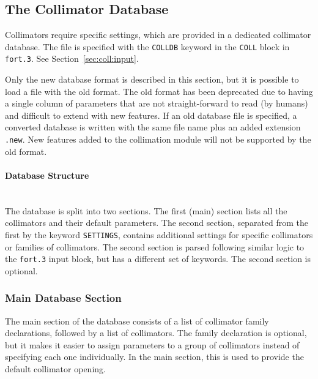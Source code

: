 
\subsection{The Collimator Database}\label{Sec:CollDB}

Collimators require specific settings, which are provided in a dedicated collimator database.
The file is specified with the \texttt{COLLDB} keyword in the \texttt{COLL} block in \texttt{fort.3}.
See Section~\ref{sec:coll:input}.

Only the new database format is described in this section, but it is possible to load a file with the old format.
The old format has been deprecated due to having a single column of parameters that are not straight-forward to read (by humans) and difficult to extend with new features.
If an old database file is specified, a converted database is written with the same file name plus an added extension \texttt{.new}.
New features added to the collimation module will not be supported by the old format.

\paragraph{Database Structure}~\\

The database is split into two sections.
The first (main) section lists all the collimators and their default parameters.
The second section, separated from the first by the keyword \texttt{SETTINGS}, contains additional settings for specific collimators or families of collimators.
The second section is parsed following similar logic to the \texttt{fort.3} input block, but has a different set of keywords.
The second section is optional.

\subsubsection{Main Database Section}

The main section of the database consists of a list of collimator family declarations, followed by a list of collimators.
The family declaration is optional, but it makes it easier to assign parameters to a group of collimators instead of specifying each one individually.
In the main section, this is used to provide the default collimator opening.

